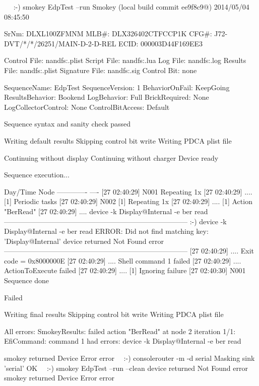 \begin{AnnotedLogFile}
~~ :-) smokey EdpTest --run
Smokey (local build commit ee9f8c9@) 2014/05/04 08:45:50

SrNm: DLXL100ZFMNM
MLB#: DLX326402CTFCCP1K
CFG#: J72-DVT/*/*/26251/MAIN-D-2-D-REL
ECID: 000003D44F169EE3

Control File:   nandfs:\AppleInternal\Diags\Logs\Smokey\EdpTest{}\Main.plist
Script File:    nandfs:\AppleInternal\Diags\Logs\Smokey\EdpTest{}\Main.lua
Log File:       nandfs:\AppleInternal\Diags\Logs\Smokey\EdpTest\Smokey.log
Results File:   nandfs:\AppleInternal\Diags\Logs\Smokey\EdpTest\PDCA.plist
Signature File: nandfs:\AppleInternal\Diags\Logs\Smokey\EdpTest\Earthbound.sig
Control Bit:    none

SequenceName:        EdpTest
SequenceVersion:     1
BehaviorOnFail:      KeepGoing
ResultsBehavior:     Bookend
LogBehavior:         Full
BrickRequired:       None
LogCollectorControl: None
ControlBitAccess:    Default

Sequence syntax and sanity check passed

Writing default results
Skipping control bit write
Writing PDCA plist file

Continuing without display
Continuing without charger
Device ready

Sequence execution...

Day/Time      Node
------------- ----
[27 02:40:29] N001 Repeating 1x
[27 02:40:29] .... 	[1] Periodic tasks
[27 02:40:29] N002 	[1] Repeating 1x
[27 02:40:29] .... 		[1] Action "BerRead"
[27 02:40:29] .... 			device -k Display@Internal -e ber read
------------------------------------------------------------------------------
:-) device -k Display@Internal -e ber read
ERROR: Did not find matching key: 'Display@Internal'
device returned Not Found error
------------------------------------------------------------------------------
[27 02:40:29] .... 			Exit code = 0x8000000E
[27 02:40:29] .... 			Shell command 1 failed
[27 02:40:29] .... 			ActionToExecute failed
[27 02:40:29] .... 		[1] Ignoring failure
[27 02:40:30] N001 Sequence done

Failed

Writing final results
Skipping control bit write
Writing PDCA plist file

All errors:
	SmokeyResults: failed action "BerRead" at node 2 iteration 1/1: 
    EfiCommand: command 1 had errors: device -k Display@Internal -e ber read

smokey returned Device Error error
~~:-) consolerouter -m -d serial
Masking sink 'serial'
OK
~~:-) smokey EdpTest --run --clean
device returned Not Found error
smokey returned Device Error error
\end{AnnotedLogFile}


